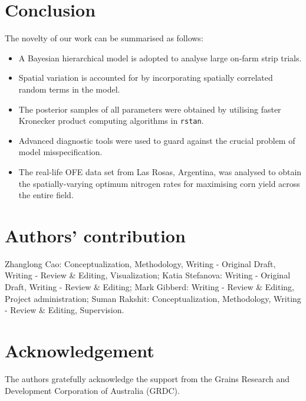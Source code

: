 \documentclass[a4paper]{article}   	%
\newcommand{\rstan}{\texttt{rstan}}
\begin{document}
	
	\section{Conclusion}
	
	The novelty of our work can be summarised as follows:
	\begin{itemize}
		\item A Bayesian hierarchical model is adopted to analyse large on-farm strip trials.
		\item Spatial variation is accounted for by   incorporating spatially correlated random terms in the model.
		\item The posterior samples of all parameters were obtained by utilising faster Kronecker product computing algorithms in \rstan.
		\item Advanced diagnostic tools were used to guard against the crucial problem of model misspecification.
		\item The real-life OFE data set from Las Rosas, Argentina, was analysed to obtain the spatially-varying optimum nitrogen rates for maximising corn yield across the entire field.
	\end{itemize}
	
	
	
	
	
	\section*{Authors’ contribution}
	
	Zhanglong Cao: Conceptualization, Methodology, Writing - Original Draft, Writing - Review \& Editing, Visualization; Katia Stefanova: Writing - Original Draft, Writing - Review \& Editing; Mark Gibberd: Writing - Review \& Editing, Project administration; Suman Rakshit: Conceptualization, Methodology, Writing - Review \& Editing, Supervision. 
	
	
	\section*{Acknowledgement}
	
	The authors gratefully acknowledge the support from the Grains Research and Development Corporation of Australia (GRDC). 
	
\end{document}
